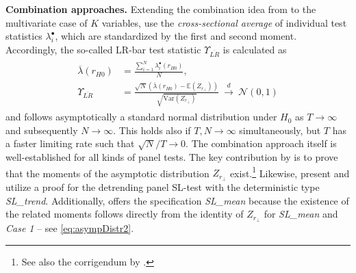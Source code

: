 \textbf{Combination approaches.} Extending the combination idea from \citet{ImPesaranShin2003} to the multivariate case of $ K $ variables, \cite{LarssonEtAl2001} use the \textit{cross-sectional average} of individual test statistics $ \lambda^\bullet_i $, which are standardized by the first and second moment. Accordingly, the so-called LR-bar test statistic $ \Upsilon_{\overline{LR}} $ is calculated as
\begin{align} \label{eq:LRbar}
\begin{split}
	\overline{\lambda} (r_{H0}) & =\frac{ \sum_{i=1}^{N} \lambda^\bullet_i \left( r_{H0} \right) }{N}, \\
	\Upsilon_{\overline{LR}} & = \frac{\sqrt{N} \left( \overline{\lambda} (r_{H0}) - \mathbb{E}\left( Z_{r_\perp} \right) \right) }{ \sqrt{ \text{Var}\left( Z_{r_\perp} \right) } } \ \overset{d}{\longrightarrow} \ \mathcal{N}(0,1)
\end{split}
\end{align}
and follows asymptotically a standard normal distribution under $ H_0 $ as $ T \to \infty $ and subsequently $ N \to \infty $. This holds also if $ T,N \to \infty $ simultaneously, but $ T $ has a faster limiting rate such that $ \sqrt{N}/T \to 0 $. The combination approach itself is well-established for all kinds of panel tests. The key contribution by \cite{LarssonEtAl2001} is to prove that the moments of the asymptotic distribution $ Z_{r_\perp} $ exist.\footnote{See also the corrigendum by \citet{OersalDroge2011}.} Likewise, \citet{OersalDroge2014} present and utilize a proof for the detrending panel SL-test with the deterministic type \textit{SL\_trend}. Additionally,  offers the specification \textit{SL\_mean} because the existence of the related moments follows directly from the identity of $ Z_{r_\perp} $ for \textit{SL\_mean} and \textit{Case 1} -- see \eqref{eq:asympDistr2}. 

